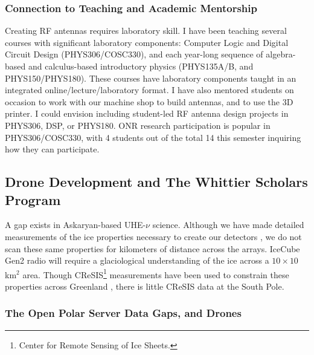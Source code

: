 \documentclass[../../../main.tex]{subfiles}
\begin{document}
\subsubsection{Connection to Teaching and Academic Mentorship}

Creating RF antennas requires laboratory skill.  I have been teaching several courses with significant laboratory components: Computer Logic and Digital Circuit Design (PHYS306/COSC330), and each year-long sequence of algebra-based and calculus-based introductory physics (PHYS135A/B, and PHYS150/PHYS180).  These courses have laboratory components taught in an integrated online/lecture/laboratory format.  I have also mentored students on occasion to work with our machine shop to build antennas, and to use the 3D printer.  I could envision including student-led RF antenna design projects in PHYS306, DSP, or PHYS180.  ONR research participation is popular in PHYS306/COSC330, with 4 students out of the total 14 this semester inquiring how they can participate.

\subsection{Drone Development and The Whittier Scholars Program}

A gap exists in Askaryan-based UHE-$\nu$ science.  Although we have made detailed measurements of the ice properties necessary to create our detectors \cite{10.3189/2015jog14j214} \cite{10.3189/2015jog15j057} \cite{barwick_besson_gorham_saltzberg_2005}, we do not scan these same properties for kilometers of distance across the arrays.  IceCube Gen2 radio will require a glaciological understanding of the ice across a $10 \times 10$ km$^2$ area.  Though CReSIS\footnote{Center for Remote Sensing of Ice Sheets.} measurements have been used to constrain these properties across Greenland \cite{10.1002/2015rs005849}, there is little CReSIS data at the South Pole.

\subsubsection{The Open Polar Server Data Gaps, and Drones}
\end{document}
